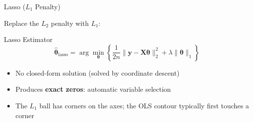 \documentclass[aspectratio=169, professionalfonts]{beamer}
\begin{document}
\begin{frame}{Lasso ($L_1$ Penalty)}

Replace the $L_2$ penalty with $L_1$:

\begin{block}{Lasso Estimator}
$$\hat{\bm{\theta}}_{\text{lasso}}
  = \arg\min_{\bm{\theta}}\left\{
    \frac{1}{2n}\|\mathbf{y}-\mathbf{X}\bm{\theta}\|_2^2
    + \lambda\|\bm{\theta}\|_1
  \right\}$$
\end{block}

\bigskip

\begin{itemize}
  \item No closed-form solution (solved by coordinate descent)
  \item Produces \textbf{exact zeros}: automatic variable selection
  \item The $L_1$ ball has corners on the axes; the OLS contour
        typically first touches a corner
\end{itemize}

\end{frame}
\end{document}
